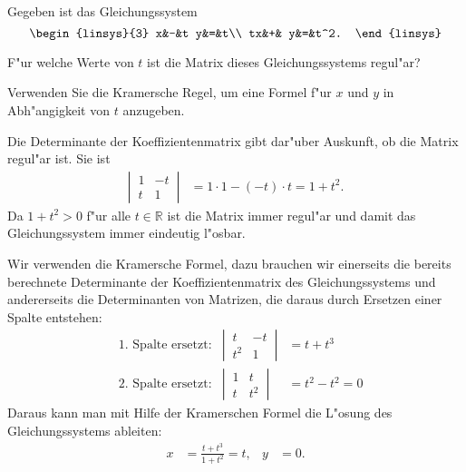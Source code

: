 Gegeben ist das Gleichungssystem
\[
\begin{linsys}{3}
 x&-&t y&=&t\\
tx&+&  y&=&t^2.
\end{linsys}
\]
\begin{teilaufgaben}
\item F"ur welche Werte von $t$ ist die Matrix dieses Gleichungssystems
regul"ar?
\item
Verwenden Sie die Kramersche Regel, um 
eine Formel f"ur $x$ und $y$ in Abh"angigkeit von $t$ anzugeben.
\end{teilaufgaben}

\begin{loesung}
\begin{teilaufgaben}
\item
Die Determinante der Koeffizientenmatrix gibt dar"uber Auskunft, ob die
Matrix regul"ar ist. Sie ist
\begin{align*}
\left|\,\begin{matrix}1&-t\\t&1\end{matrix}\,\right|
&=1\cdot 1-(-t)\cdot t=1+t^2.
\end{align*}
Da $1+t^2>0$ f"ur alle $t\in\mathbb R$ ist die Matrix immer regul"ar und
damit das Gleichungssystem immer eindeutig l"osbar.
\item
Wir verwenden die Kramersche Formel, dazu brauchen wir einerseits die bereits
berechnete Determinante der Koeffizientenmatrix des Gleichungssystems
und andererseits die Determinanten von Matrizen, die daraus durch Ersetzen
einer Spalte entstehen:
\begin{align*}
&\text{1.~Spalte ersetzt:}&
\left|\,\begin{matrix}t&-t\\t^2&1\end{matrix}\,\right|
&=t+t^3
\\
&\text{2.~Spalte ersetzt:}&
\left|\,\begin{matrix}1&t\\t&t^2\end{matrix}\,\right|
&=t^2-t^2=0
\end{align*}
Daraus kann man mit Hilfe der Kramerschen Formel die L"osung des
Gleichungssystems ableiten:
\begin{align*}
x&=\frac{t+t^3}{1+t^2}=t,&
y&=0.
\end{align*}
\qedhere
\end{teilaufgaben}
\end{loesung}
